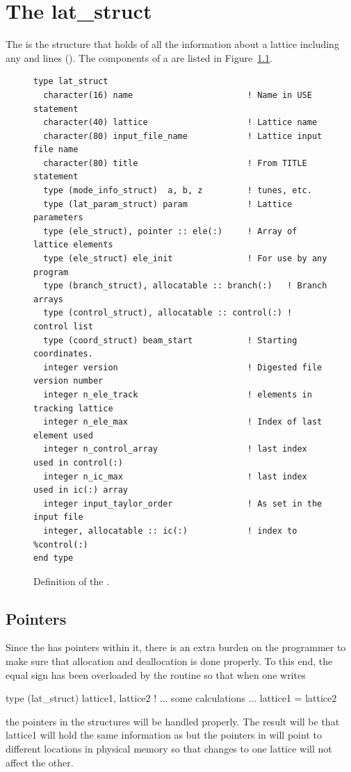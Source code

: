 \chapter{The lat_struct}
\label{c:lat.struct}

The  is the structure that holds of all the information
about a lattice including any  and  lines
(). The components of a  are listed in
Figure~\ref{f:lat.struct}.
\begin{figure}[htb]
\centering
\begin{verbatim}
type lat_struct
  character(16) name                       ! Name in USE statement
  character(40) lattice                    ! Lattice name
  character(80) input_file_name            ! Lattice input file name
  character(80) title                      ! From TITLE statement
  type (mode_info_struct)  a, b, z         ! tunes, etc.
  type (lat_param_struct) param            ! Lattice parameters
  type (ele_struct), pointer :: ele(:)     ! Array of lattice elements
  type (ele_struct) ele_init               ! For use by any program
  type (branch_struct), allocatable :: branch(:)   ! Branch arrays
  type (control_struct), allocatable :: control(:) ! control list
  type (coord_struct) beam_start           ! Starting coordinates.
  integer version                          ! Digested file version number
  integer n_ele_track                      ! elements in tracking lattice
  integer n_ele_max                        ! Index of last element used
  integer n_control_array                  ! last index used in control(:)
  integer n_ic_max                         ! last index used in ic(:) array
  integer input_taylor_order               ! As set in the input file
  integer, allocatable :: ic(:)            ! index to %control(:)
end type
\end{verbatim}
\caption{Definition of the .}
\label{f:lat.struct}
\end{figure}

\section{Pointers}
\label{s:lat:point}

Since the  has pointers within it, there is an extra
burden on the programmer to make sure that allocation and deallocation
is done properly. To this end, the equal sign has been overloaded by
the routine  so that when one writes
\begin{example}
    type (lat_struct) lattice1, lattice2
    ! ... some calculations ...
    lattice1 = lattice2
\end{example}
the pointers in the  structures will be handled
properly. The result will be that lattice1 will hold the same
information as  but the pointers in  will
point to different locations in physical memory so that changes to one
lattice will not affect the other.

